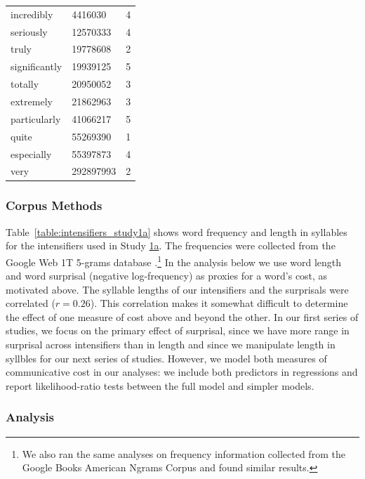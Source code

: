 \documentclass[10pt,letterpaper]{article}
\begin{document}
\begin{table}[ht]
\begin{center}
\begin{tabular}{llc}
    incredibly & 4416030 & 4 \\
    seriously & 12570333 & 4 \\
    truly & 19778608 & 2 \\
    significantly & 19939125 & 5 \\
    totally & 20950052 & 3 \\
    extremely & 21862963 & 3 \\
    particularly & 41066217 & 5 \\
    quite & 55269390 & 1 \\
    especially & 55397873 & 4 \\
    very & 292897993 & 2
  \end{tabular}
 \end{center}
\end{table}

\subsubsection{Corpus Methods}

Table~\ref{table:intensifiers_study1a} shows word frequency and length in syllables for the intensifiers used in Study \hyperref[sec:study1a]{1a}.
The frequencies were collected from the Google Web 1T 5-grams database \cite{brants_web_2006}.\footnote{
  We also ran the same analyses on frequency information collected from the Google Books American Ngrams Corpus \cite{michel_quantitative_2011} and found similar results.
}
In the analysis below we use word length and word surprisal (negative log-frequency) as proxies for a word's cost, as motivated above.
The syllable lengths of our intensifiers and the surprisals were correlated ($r = 0.26$).
This correlation makes it somewhat difficult to determine the effect of one measure of cost above and beyond the other.
In our first series of studies, we focus on the primary effect of surprisal, since we have more range in surprisal across intensifiers than in length and since we manipulate length in syllbles for our next series of studies.
However, we model both measures of communicative cost in our analyses: we include both predictors in regressions and report likelihood-ratio tests between the full model and simpler models.

\subsubsection{Analysis}
\end{document}
